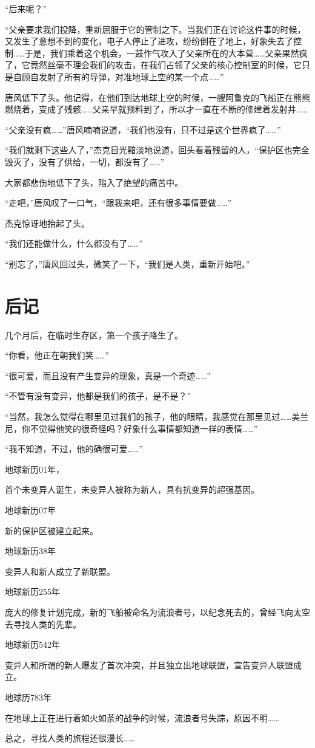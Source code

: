 “后来呢？” 

“父亲要求我们投降，重新屈服于它的管制之下。当我们正在讨论这件事的时候，又发生了意想不到的变化，电子人停止了进攻，纷纷倒在了地上，好象失去了控制……于是，我们乘着这个机会，一鼓作气攻入了父亲所在的大本营……父亲果然疯了，它竟然丝毫不理会我们的攻击，在我们占领了父亲的核心控制室的时候，它只是自顾自发射了所有的导弹，对准地球上空的某一个点……” 

唐风低下了头。他记得，在他们到达地球上空的时候，一艘阿鲁克的飞船正在熊熊燃烧着，变成了残骸……父亲早就预料到了，所以才一直在不断的修建着发射井…… 

“父亲没有疯……”唐风喃喃说道，“我们也没有，只不过是这个世界疯了……” 

“我们就剩下这些人了，”杰克目光黯淡地说道，回头看着残留的人，“保护区也完全毁灭了，没有了供给，一切，都没有了……” 

大家都悲伤地低下了头，陷入了绝望的痛苦中。 

“走吧，”唐风叹了一口气，“跟我来吧，还有很多事情要做……” 

杰克惊讶地抬起了头。 

“我们还能做什么，什么都没有了……” 

“别忘了，”唐风回过头，微笑了一下，“我们是人类，重新开始吧。” 

\chapter{后记} 

几个月后，在临时生存区，第一个孩子降生了。 

“你看，他正在朝我们笑……” 

“很可爱，而且没有产生变异的现象，真是一个奇迹……” 

“不管有没有变异，他都是我们的孩子，是不是？” 

“当然，我怎么觉得在哪里见过我们的孩子，他的眼睛，我感觉在那里见过……美兰尼，你不觉得他笑的很奇怪吗？好象什么事情都知道一样的表情……” 

“我不知道，不过，他的确很可爱……” 

地球新历01年， 

首个未变异人诞生，未变异人被称为新人，具有抗变异的超强基因。 

地球新历07年 

新的保护区被建立起来。 

地球新历38年 

变异人和新人成立了新联盟。 

地球新历255年 

庞大的修复计划完成，新的飞船被命名为流浪者号，以纪念死去的，曾经飞向太空去寻找人类的先辈。 

地球新历542年 

变异人和所谓的新人爆发了首次冲突，并且独立出地球联盟，宣告变异人联盟成立。 

地球历783年 

在地球上正在进行着如火如荼的战争的时候，流浪者号失踪，原因不明…… 

总之，寻找人类的旅程还很漫长…… 